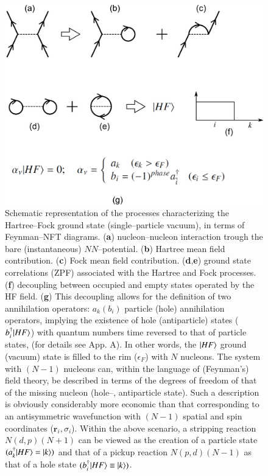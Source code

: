 \begin{figure}
\centerline {
\includegraphics*[width=12cm]{introduccion/figs/figintro4}
}
\caption{Schematic representation of the processes characterizing the Hartree--Fock ground state (single--particle vacuum), in terms of Feynman--NFT diagrams. (\textbf{a}) nucleon--nucleon interaction trough the bare (instantaneous) $NN$--potential. (\textbf{b}) Hartree mean field contribution. (\textbf{c}) Fock mean field contribution. (\textbf{d},\textbf{e}) ground state correlations (ZPF) associated with the Hartree and Fock processes. (\textbf{f}) decoupling between occupied and empty states operated by the HF field. (\textbf{g}) This decoupling allows for the definition of two annihilation operators: $a_k(b_i)$ particle (hole) annihilation operators,   implying the existence of hole (antiparticle) states ($b^\dagger_i|{HF} \rangle$) with quantum numbers time reversed to that of particle states, (for details see  \cite{Brink:05} App. A). In other words, the $|{HF} \rangle$ ground (vacuum) state is filled to the rim ($\epsilon_F$) with $N$ nucleons. The system with $(N-1)$ nucleons can, within the language of (Feynman's) field theory, be described in terms of the degrees of freedom of that of the missing nucleon (hole--, antiparticle state). Such a description is obviously considerably more economic than that corresponding to an antisymmetric wavefunction with $(N-1)$ spatial and spin coordinates ($\mathbf r_i,\sigma_i$). Within the above scenario, a stripping reaction $N(d,p)(N+1)$ can be viewed as the creation of a particle state $(a^\dagger_k|{HF} \rangle=|{k} \rangle)$ and that of a pickup reaction $N(p,d)(N-1)$ as that of a hole state $(b^\dagger_i|{HF} \rangle\equiv|{k} \rangle)$.}
\label{figintro4}
\end{figure}

